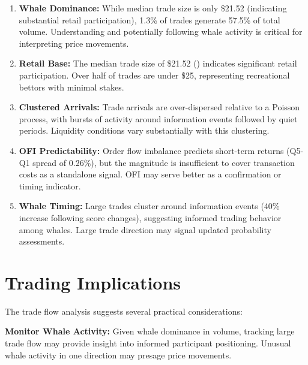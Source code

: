 \begin{keyfindings}
\begin{enumerate}
    \item \textbf{Whale Dominance:} While median trade size is only \$21.52 (indicating substantial retail participation), 1.3\% of trades generate 57.5\% of total volume. Understanding and potentially following whale activity is critical for interpreting price movements.

    \item \textbf{Retail Base:} The median trade size of \$21.52 () indicates significant retail participation. Over half of trades are under \$25, representing recreational bettors with minimal stakes.

    \item \textbf{Clustered Arrivals:} Trade arrivals are over-dispersed relative to a Poisson process, with bursts of activity around information events followed by quiet periods. Liquidity conditions vary substantially with this clustering.

    \item \textbf{OFI Predictability:} Order flow imbalance predicts short-term returns (Q5-Q1 spread of 0.26\%), but the magnitude is insufficient to cover transaction costs as a standalone signal. OFI may serve better as a confirmation or timing indicator.

    \item \textbf{Whale Timing:} Large trades cluster around information events (40\% increase following score changes), suggesting informed trading behavior among whales. Large trade direction may signal updated probability assessments.
\end{enumerate}
\end{keyfindings}

\section{Trading Implications}

The trade flow analysis suggests several practical considerations:

\textbf{Monitor Whale Activity:} Given whale dominance in volume, tracking large trade flow may provide insight into informed participant positioning. Unusual whale activity in one direction may presage price movements.

